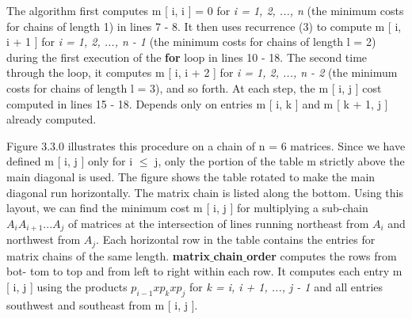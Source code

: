 The algorithm first computes m [ i, i ] = 0 for {\itshape i = 1, 2, ..., n}  (the minimum costs for chains of length 1) in lines 7 - 8. It then uses recurrence (3) to compute m [ i, i + 1 ] for {\itshape i = 1, 2, ..., n - 1} (the minimum costs for chains of length l = 2) during the first execution of the {\bfseries for} loop in lines 10 - 18. The second time through the loop, it computes m [ i, i + 2 ] for {\itshape i = 1, 2, ..., n - 2} (the minimum costs for chains of length l = 3), and so forth. At each step, the m [ i, j ] cost computed in lines 15 - 18. Depends only on entries m [ i, k ] and m [ k + 1, j ] already computed. \hfill \break

Figure 3.3.0 illustrates this procedure on a chain of n = 6 matrices. Since we have defined m [ i, j ] only for i $\leq$ j, only the portion of the table m strictly above the main diagonal is used. The figure shows the table rotated to make the main diagonal run horizontally. The matrix chain is listed along the bottom. Using this layout, we can find the minimum cost m [ i, j ] for multiplying a sub-chain $A_{i} A_{i+1} ... A_{j}$ of matrices at the intersection of lines running northeast from $A_{i}$ and northwest from $A_{j}$. Each horizontal row in the table contains the entries for matrix chains of the same length. {\bfseries matrix$\_$chain$\_$order} computes the rows from bot- tom to top and from left to right within each row. It computes each entry m [  i, j ] using the products $p_{i-1} x p_{k} x p_{j}$ for {\itshape k = i, i + 1, ..., j - 1} and all entries southwest and southeast from m [ i, j ].

\pagebreak
